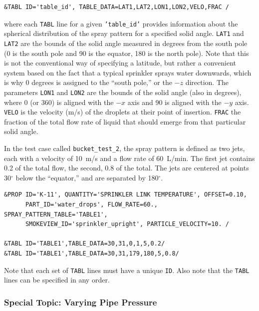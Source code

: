 \documentclass[11pt]{book}
\newcommand{\ct}{\tt\small}
\begin{document}
\footnotesize
\begin{verbatim}
&TABL ID='table_id', TABLE_DATA=LAT1,LAT2,LON1,LON2,VELO,FRAC /
\end{verbatim} \normalsize

\noindent
where each {\ct TABL} line for a given {\ct 'table\_id'} provides information about the spherical distribution of the spray pattern
for a specified solid angle. {\ct LAT1} and {\ct LAT2} are the bounds of the solid angle measured in degrees from
the south pole (0 is the south pole and 90 is the equator, 180 is the north pole).  Note that this is not the conventional way of
specifying a latitude, but rather a convenient system based on the fact that a typical sprinkler sprays water downwards, which is
why 0 degrees is assigned to the ``south pole,'' or the $-z$ direction. The parameters {\ct LON1} and {\ct LON2} are the
bounds of the solid angle (also in degrees),
where 0 (or 360) is aligned with the $-x$ axis and 90 is aligned with the $-y$ axis.  {\ct VELO} is the velocity (m/s) of the droplets at their
point of insertion.
{\ct FRAC} the fraction of the total flow rate of liquid that should emerge from that particular solid angle.

In the test case called {\ct bucket\_test\_2}, the spray pattern is defined as two jets, each with a velocity of 10~m/s and a flow rate
of 60~L/min. The first jet contains 0.2 of the total flow, the second, 0.8 of the total.
The jets are centered at points 30$^\circ$ below the ``equator,'' and are separated by 180$^\circ$.

\footnotesize
\begin{verbatim}
&PROP ID='K-11', QUANTITY='SPRINKLER LINK TEMPERATURE', OFFSET=0.10,
      PART_ID='water_drops', FLOW_RATE=60., SPRAY_PATTERN_TABLE='TABLE1',
      SMOKEVIEW_ID='sprinkler_upright', PARTICLE_VELOCITY=10. /

&TABL ID='TABLE1',TABLE_DATA=30,31,0,1,5,0.2/
&TABL ID='TABLE1',TABLE_DATA=30,31,179,180,5,0.8/
\end{verbatim}
\normalsize

\noindent Note that each set of {\ct TABL} lines must have a unique {\ct ID}.  Also note that
the {\ct TABL} lines can be specified in any order.




\subsubsection{Special Topic: Varying Pipe Pressure}
\label{info:pressureramp}
\end{document}
